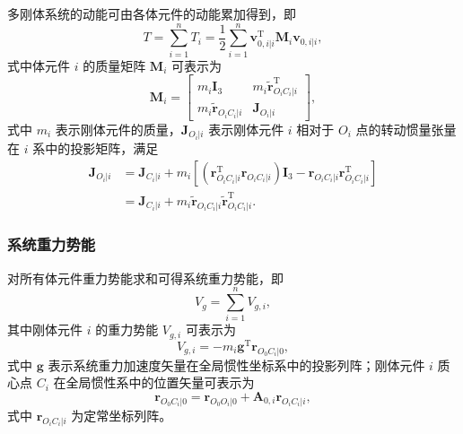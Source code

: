 多刚体系统的动能可由各体元件的动能累加得到，即
\begin{equation}\label{eq:11.64}
T = \sum_{i=1}^{n} T_i = \frac{1}{2} \sum_{i=1}^{n} \boldsymbol{v}_{0,i|i}^{\mathrm{T}} \boldsymbol{M}_i \boldsymbol{v}_{0,i|i},
\end{equation}
式中体元件 $i$ 的质量矩阵 $\boldsymbol{M}_i$ 可表示为
\begin{equation}\label{eq:11.65}
\boldsymbol{M}_i = \begin{bmatrix}
m_i \boldsymbol{I}_3 & m_i \tilde{\boldsymbol{r}}_{O_iC_i|i}^{\mathrm{T}} \\[4pt]
m_i \tilde{\boldsymbol{r}}_{O_iC_i|i} & \boldsymbol{J}_{O_i|i}
\end{bmatrix},
\end{equation}
式中 $m_i$ 表示刚体元件的质量，$\boldsymbol{J}_{O_i|i}$ 表示刚体元件 $i$ 相对于 $O_i$ 点的转动惯量张量在 $i$ 系中的投影矩阵，满足
\begin{equation}\label{eq:11.66}
\begin{aligned}
\boldsymbol{J}_{O_i|i} &= \boldsymbol{J}_{C_i|i} + m_i \left[ \left( \boldsymbol{r}_{O_iC_i|i}^{\mathrm{T}} \boldsymbol{r}_{O_iC_i|i} \right) \boldsymbol{I}_3 - \boldsymbol{r}_{O_iC_i|i} \boldsymbol{r}_{O_iC_i|i}^{\mathrm{T}} \right] \\
&= \boldsymbol{J}_{C_i|i} + m_i \tilde{\boldsymbol{r}}_{O_iC_i|i} \tilde{\boldsymbol{r}}_{O_iC_i|i}^{\mathrm{T}}.
\end{aligned}
\end{equation}

\subsubsection{系统重力势能}

对所有体元件重力势能求和可得系统重力势能，即
\begin{equation}\label{eq:11.67}
V_g = \sum_{i=1}^{n} V_{g,i},
\end{equation}
其中刚体元件 $i$ 的重力势能 $V_{g,i}$ 可表示为
\begin{equation}\label{eq:11.68}
V_{g,i} = -m_i \boldsymbol{g}^{\mathrm{T}} \boldsymbol{r}_{O_0C_i|0},
\end{equation}
式中 $\boldsymbol{g}$ 表示系统重力加速度矢量在全局惯性坐标系中的投影列阵；刚体元件 $i$ 质心点 $C_i$ 在全局惯性系中的位置矢量可表示为
\begin{equation}\label{eq:11.69}
\boldsymbol{r}_{O_0C_i|0} = \boldsymbol{r}_{O_0O_i|0} + \boldsymbol{A}_{0,i} \boldsymbol{r}_{O_iC_i|i},
\end{equation}
式中 $\boldsymbol{r}_{O_iC_i|i}$ 为定常坐标列阵。


